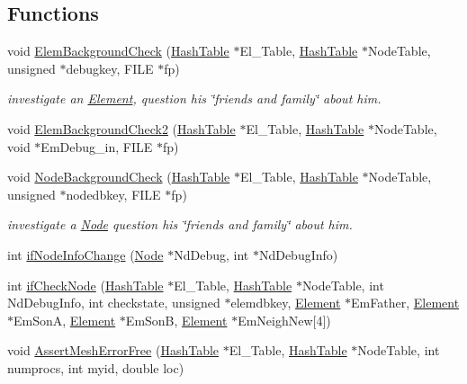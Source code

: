\subsection*{Functions}
\begin{CompactItemize}
\item 
void \hyperlink{updatenei_8C_a2}{Elem\-Background\-Check} (\hyperlink{classHashTable}{Hash\-Table} $\ast$El\_\-Table, \hyperlink{classHashTable}{Hash\-Table} $\ast$Node\-Table, unsigned $\ast$debugkey, FILE $\ast$fp)
\begin{CompactList}\small\item\em investigate an \hyperlink{classElement}{Element}, question his \char`\"{}friends and family\char`\"{} about him. \item\end{CompactList}\item 
void \hyperlink{updatenei_8C_a3}{Elem\-Background\-Check2} (\hyperlink{classHashTable}{Hash\-Table} $\ast$El\_\-Table, \hyperlink{classHashTable}{Hash\-Table} $\ast$Node\-Table, void $\ast$Em\-Debug\_\-in, FILE $\ast$fp)
\item 
void \hyperlink{updatenei_8C_a4}{Node\-Background\-Check} (\hyperlink{classHashTable}{Hash\-Table} $\ast$El\_\-Table, \hyperlink{classHashTable}{Hash\-Table} $\ast$Node\-Table, unsigned $\ast$nodedbkey, FILE $\ast$fp)
\begin{CompactList}\small\item\em investigate a \hyperlink{classNode}{Node} question his \char`\"{}friends and family\char`\"{} about him. \item\end{CompactList}\item 
int \hyperlink{updatenei_8C_a5}{if\-Node\-Info\-Change} (\hyperlink{classNode}{Node} $\ast$Nd\-Debug, int $\ast$Nd\-Debug\-Info)
\item 
int \hyperlink{updatenei_8C_a6}{if\-Check\-Node} (\hyperlink{classHashTable}{Hash\-Table} $\ast$El\_\-Table, \hyperlink{classHashTable}{Hash\-Table} $\ast$Node\-Table, int Nd\-Debug\-Info, int checkstate, unsigned $\ast$elemdbkey, \hyperlink{classElement}{Element} $\ast$Em\-Father, \hyperlink{classElement}{Element} $\ast$Em\-Son\-A, \hyperlink{classElement}{Element} $\ast$Em\-Son\-B, \hyperlink{classElement}{Element} $\ast$Em\-Neigh\-New\mbox{[}4\mbox{]})
\item 
void \hyperlink{updatenei_8C_a7}{Assert\-Mesh\-Error\-Free} (\hyperlink{classHashTable}{Hash\-Table} $\ast$El\_\-Table, \hyperlink{classHashTable}{Hash\-Table} $\ast$Node\-Table, int numprocs, int myid, double loc)

\end{CompactItemize}
